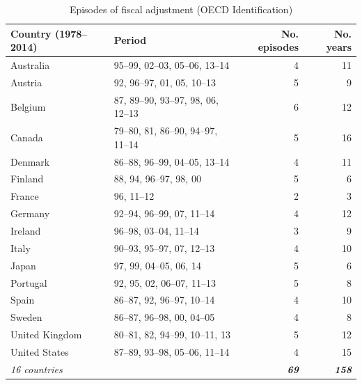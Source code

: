 \begin{table}[!htbp]
\centering
\caption{Episodes of fiscal adjustment (OECD Identification)}
\small
\renewcommand{\arraystretch}{1.15}
\setlength{\tabcolsep}{6pt}
\begin{tabular*}{\textwidth}{@{\extracolsep{\fill}} l l r r}
\toprule
Country (1978--2014) & Period & No. episodes & No. years \\
\midrule
Australia & 95--99, 02--03, 05--06, 13--14 & 4 & 11 \\
Austria & 92, 96--97, 01, 05, 10--13 & 5 &  9 \\
Belgium & 87, 89--90, 93--97, 98, 06, 12--13 & 6 & 12 \\
Canada & 79--80, 81, 86--90, 94--97, 11--14 & 5 & 16 \\
Denmark & 86--88, 96--99, 04--05, 13--14 & 4 & 11 \\
Finland & 88, 94, 96--97, 98, 00 & 5 &  6 \\
France & 96, 11--12 & 2 &  3 \\
Germany & 92--94, 96--99, 07, 11--14 & 4 & 12 \\
Ireland & 96--98, 03--04, 11--14 & 3 &  9 \\
Italy & 90--93, 95--97, 07, 12--13 & 4 & 10 \\
Japan & 97, 99, 04--05, 06, 14 & 5 &  6 \\
Portugal & 92, 95, 02, 06--07, 11--13 & 5 &  8 \\
Spain & 86--87, 92, 96--97, 10--14 & 4 & 10 \\
Sweden & 86--87, 96--98, 00, 04--05 & 4 &  8 \\
United Kingdom & 80--81, 82, 94--99, 10--11, 13 & 5 & 12 \\
United States & 87--89, 93--98, 05--06, 11--14 & 4 & 15 \\
\midrule
\textit{16 countries} & \textit{} & \textit{\textbf{69}} & \textit{\textbf{158}} \\
\bottomrule
\end{tabular*}
\end{table}
